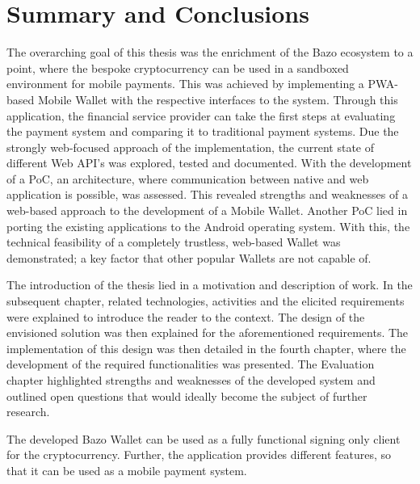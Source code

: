 \chapter{Summary and Conclusions}

The overarching goal of this thesis was the enrichment of the Bazo ecosystem to a point, where the bespoke cryptocurrency can be used in a sandboxed environment for mobile payments. This was achieved by implementing a PWA-based Mobile Wallet with the respective interfaces to the system. Through this application, the financial service provider can take the first steps at evaluating the payment system and comparing it to traditional payment systems. Due the strongly web-focused approach of the implementation, the current state of different Web API's was explored, tested and documented. With the development of a PoC, an architecture, where communication between native and web application is possible, was assessed. This revealed strengths and weaknesses of a web-based approach to the development of a Mobile Wallet. Another PoC lied in porting the existing applications to the Android operating system. With this, the technical feasibility of a completely trustless, web-based Wallet was demonstrated; a key factor that other popular Wallets are not capable of.

The introduction of the thesis lied in a motivation and description of work. In the subsequent chapter, related technologies, activities and the elicited requirements were explained to introduce the reader to the context. The design of the envisioned solution was then explained for the aforementioned requirements. The implementation of this design was then detailed in the fourth chapter, where the development of the required functionalities was presented. The Evaluation chapter highlighted strengths and weaknesses of the developed system and outlined open questions that would ideally become the subject of further research.

The developed Bazo Wallet can be used as a fully functional signing only client for the cryptocurrency. Further, the application provides different features, so that it can be used as a mobile payment system. 